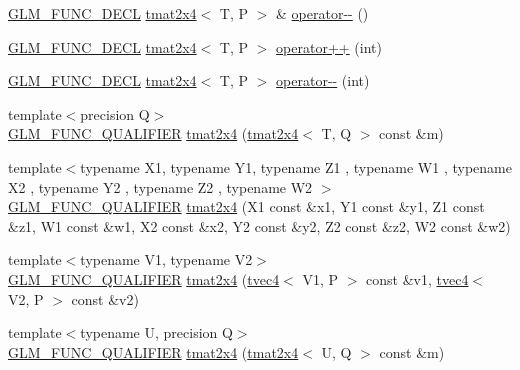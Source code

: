 \begin{DoxyCompactItemize}
\item 
\hyperlink{setup_8hpp_ab2d052de21a70539923e9bcbf6e83a51}{G\+L\+M\+\_\+\+F\+U\+N\+C\+\_\+\+D\+E\+CL} \hyperlink{structglm_1_1detail_1_1tmat2x4}{tmat2x4}$<$ T, P $>$ \& \hyperlink{structglm_1_1detail_1_1tmat2x4_a556fd133fa224ffb3d2ebf13d727d820}{operator-\/-\/} ()
\item 
\hyperlink{setup_8hpp_ab2d052de21a70539923e9bcbf6e83a51}{G\+L\+M\+\_\+\+F\+U\+N\+C\+\_\+\+D\+E\+CL} \hyperlink{structglm_1_1detail_1_1tmat2x4}{tmat2x4}$<$ T, P $>$ \hyperlink{structglm_1_1detail_1_1tmat2x4_a8917eda810b07dcf0a5e65e828724505}{operator++} (int)
\item 
\hyperlink{setup_8hpp_ab2d052de21a70539923e9bcbf6e83a51}{G\+L\+M\+\_\+\+F\+U\+N\+C\+\_\+\+D\+E\+CL} \hyperlink{structglm_1_1detail_1_1tmat2x4}{tmat2x4}$<$ T, P $>$ \hyperlink{structglm_1_1detail_1_1tmat2x4_a6cde4bc7178ddd37a9f8125f9f350ba0}{operator-\/-\/} (int)
\item 
{\footnotesize template$<$precision Q$>$ }\\\hyperlink{setup_8hpp_a33fdea6f91c5f834105f7415e2a64407}{G\+L\+M\+\_\+\+F\+U\+N\+C\+\_\+\+Q\+U\+A\+L\+I\+F\+I\+ER} \hyperlink{structglm_1_1detail_1_1tmat2x4_ac1a53a7910b8085b462f623c70252f10}{tmat2x4} (\hyperlink{structglm_1_1detail_1_1tmat2x4}{tmat2x4}$<$ T, Q $>$ const \&m)
\item 
{\footnotesize template$<$typename X1, typename Y1, typename Z1 , typename W1 , typename X2 , typename Y2 , typename Z2 , typename W2 $>$ }\\\hyperlink{setup_8hpp_a33fdea6f91c5f834105f7415e2a64407}{G\+L\+M\+\_\+\+F\+U\+N\+C\+\_\+\+Q\+U\+A\+L\+I\+F\+I\+ER} \hyperlink{structglm_1_1detail_1_1tmat2x4_ad19123b26d51d5e015a0667d9dea5ae9}{tmat2x4} (X1 const \&x1, Y1 const \&y1, Z1 const \&z1, W1 const \&w1, X2 const \&x2, Y2 const \&y2, Z2 const \&z2, W2 const \&w2)
\item 
{\footnotesize template$<$typename V1, typename V2$>$ }\\\hyperlink{setup_8hpp_a33fdea6f91c5f834105f7415e2a64407}{G\+L\+M\+\_\+\+F\+U\+N\+C\+\_\+\+Q\+U\+A\+L\+I\+F\+I\+ER} \hyperlink{structglm_1_1detail_1_1tmat2x4_a153edc0a905dc1128b78120c22a27b02}{tmat2x4} (\hyperlink{structglm_1_1detail_1_1tvec4}{tvec4}$<$ V1, P $>$ const \&v1, \hyperlink{structglm_1_1detail_1_1tvec4}{tvec4}$<$ V2, P $>$ const \&v2)
\item 
{\footnotesize template$<$typename U, precision Q$>$ }\\\hyperlink{setup_8hpp_a33fdea6f91c5f834105f7415e2a64407}{G\+L\+M\+\_\+\+F\+U\+N\+C\+\_\+\+Q\+U\+A\+L\+I\+F\+I\+ER} \hyperlink{structglm_1_1detail_1_1tmat2x4_afdac996e0de8c8beee66facceed41f53}{tmat2x4} (\hyperlink{structglm_1_1detail_1_1tmat2x4}{tmat2x4}$<$ U, Q $>$ const \&m)

\end{DoxyCompactItemize}
